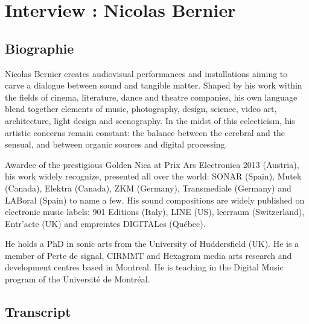 \chapter{Interview : Nicolas Bernier}
\label{appendix:bernier}

\section*{Biographie}

Nicolas Bernier creates audiovisual performances and installations aiming to carve a dialogue between sound and tangible matter. Shaped by his work within the fields of cinema, literature, dance and theatre companies, his own language blend together elements of music, photography, design, science, video art, architecture, light design and scenography. In the midst of this eclecticism, his artistic concerns remain constant: the balance between the cerebral and the sensual, and between organic sources and digital processing.

Awardee of the prestigious Golden Nica at Prix Ars Electronica 2013 (Austria), his work widely recognize, presented all over the world: SONAR (Spain), Mutek (Canada), Elektra (Canada), ZKM (Germany), Transmediale (Germany) and LABoral (Spain) to name a few. His sound compositions are widely published on electronic music labels: 901 Editions (Italy), LINE (US), leerraum (Switzerland), Entr’acte (UK) and empreintes DIGITALes (Québec).

He holds a PhD in sonic arts from the University of Huddersfield (UK). He is a member of Perte de signal, CIRMMT and Hexagram media arts research and development centres based in Montreal. He is teaching in the Digital Music program of the Université de Montréal. 


\section*{Transcript}

